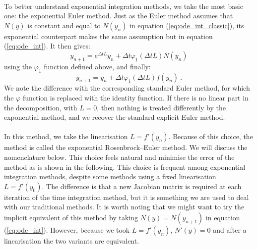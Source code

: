       \paragraph{}
      To better understand exponential integration methods, we take the most basic one: the exponential Euler method.
      Just as the Euler method assumes that $N\left(y\right)$ is constant and equal to $N\left(y_n\right)$ in equation (\ref{eq:ode_int_classic}), its exponential counterpart makes the same assumption but in equation (\ref{eq:ode_int}).
      It then gives:
      \begin{equation}
        y_{n+1} = e^{\Delta t L} y_n + \Delta t \varphi_1\left(\Delta t L\right) N\left(y_n\right)
      \end{equation}
      using the $\varphi_1$ function defined above, and finally:
      \begin{equation}
        y_{n+1} = y_n + \Delta t \varphi_1\left(\Delta t L\right) f\left(y_n\right) \ .
      \end{equation}
      We note the difference with the corresponding standard Euler method, for which the $\varphi$ function is replaced with the identity function.
      If there is no linear part in the decomposition, with $L = 0$, then nothing is treated differently by the exponential method, and we recover the standard explicit Euler method.

      \paragraph{}
      In this method, we take the linearisation $L = f'\left(y_n\right)$.
      Because of this choice, the method is called the exponential Rosenbrock--Euler method.
      We will discuss the nomenclature below.
      This choice feels natural and minimise the error of the method as is shown in the following.
      This choice is frequent among exponential integration methods, despite some methods using a fixed linearisation $L = f'\left(y_0\right)$.
      The difference is that a new Jacobian matrix is required at each iteration of the time integration method, but it is something we are used to deal with our traditional methods.
      It is worth noting that we might want to try the implicit equivalent of this method by taking $N\left(y\right) = N\left(y_{n+1}\right)$ in equation (\ref{eq:ode_int}).
      However, because we took $L = f'\left(y_n\right)$, $N'\left(y\right) = 0$ and after a linearisation the two variants are equivalent.


